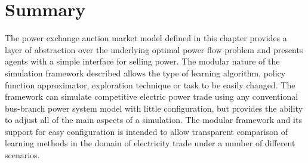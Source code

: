 %

\section{Summary}
The power exchange auction market model defined in this chapter provides a layer
of abstraction over the underlying optimal power flow problem and presents
agents with a simple interface for selling power.  The modular nature of the
simulation framework described allows the type of learning algorithm, policy
function approximator, exploration technique or task to be easily changed.  The
framework can simulate competitive electric power trade using any conventional
bus-branch power system model with little configuration, but provides the
ability to adjust all of the main aspects of a simulation. The modular framework
and its support for easy configuration is intended to allow transparent
comparison of learning methods in the domain of electricity trade under a number
of different scenarios.
